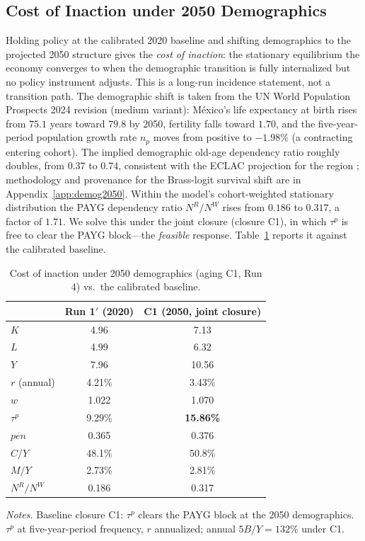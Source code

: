 \documentclass[12pt,a4paper]{article}
\begin{document}
\subsection{Cost of Inaction under 2050 Demographics}
\label{sec:aging}

Holding policy at the calibrated 2020 baseline and shifting demographics to the projected 2050 structure gives the \emph{cost of inaction}: the stationary equilibrium the economy converges to when the demographic transition is fully internalized but no policy instrument adjusts. This is a long-run incidence statement, not a transition path. The demographic shift is taken from the UN World Population Prospects 2024 revision (medium variant): M\'exico's life expectancy at birth rises from $75.1$ years toward $79.8$ by 2050, fertility falls toward $1.70$, and the five-year-period population growth rate $n_p$ moves from positive to $-1.98\%$ (a contracting entering cohort). The implied demographic old-age dependency ratio roughly doubles, from $0.37$ to $0.74$, consistent with the ECLAC projection for the region \citep{ECLAC2022}; methodology and provenance for the Brass-logit survival shift are in Appendix~\ref{app:demog2050}. Within the model's cohort-weighted stationary distribution the PAYG dependency ratio $N^R/N^W$ rises from $0.186$ to $0.317$, a factor of $1.71$. We solve this under the joint closure (closure C1), in which $\tau^p$ is free to clear the PAYG block---the \emph{feasible} response. Table~\ref{tab:aging_c1} reports it against the calibrated baseline.

\begin{table}[H]
\centering
\caption{Cost of inaction under 2050 demographics (aging C1, Run 4) vs.\ the calibrated baseline.}
\label{tab:aging_c1}
\begin{tabular}{lcc}
\toprule
 & Run 1$'$ (2020) & C1 (2050, joint closure) \\
\midrule
$K$               & 4.96    & 7.13   \\
$L$               & 4.99    & 6.32   \\
$Y$               & 7.96    & 10.56  \\
$r$ (annual)      & 4.21\%  & 3.43\% \\
$w$               & 1.022   & 1.070  \\
$\tau^p$          & 9.29\%  & \textbf{15.86\%} \\
$\overline{pen}$  & 0.365   & 0.376  \\
$C/Y$             & 48.1\%  & 50.8\% \\
$M/Y$             & 2.73\%  & 2.81\% \\
$N^R/N^W$         & 0.186   & 0.317  \\
\bottomrule
\end{tabular}

\vspace{0.5em}
\begin{minipage}{0.92\textwidth}
\footnotesize \textit{Notes.} Baseline closure C1: $\tau^p$ clears the PAYG block at the 2050 demographics. $\tau^p$ at five-year-period frequency, $r$ annualized; annual $5B/Y=132\%$ under C1.
\end{minipage}
\end{table}
\end{document}
